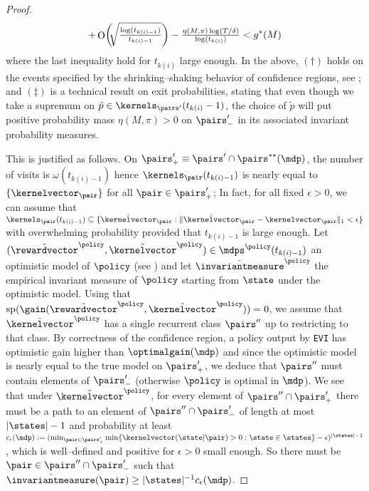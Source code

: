 \documentclass[preprint,cleveref,12pt]{colt2025}
\DeclarePairedDelimiter{\braces}{\{}{\}}	%
\DeclarePairedDelimiter{\parens}{(}{)}	%
\DeclarePairedDelimiter{\abs}{\lvert}{\rvert}	%
\DeclarePairedDelimiter{\norm}{\lVert}{\rVert}	%
\newcommand{\vecspan}[1]{\mathrm{sp}\parens{#1}}
\DeclareMathOperator*{\OH}{\mathrm{O}}
\def\model{\mdp}
\def\models{\mdps}
\def\kernel{\kernelvector}
\def\reward{\rewardvector}
\def\optgain{\optimalgain} %
\def\imeasure{\invariantmeasure}
\begin{document}
\begin{proof}
\begin{align*}
            + \OH \parens*{ \!\! \sqrt{ \tfrac{\log(t_{k(i)-1})}{t_{k(i)-1}} } }
            - \tfrac{\eta(M, \pi) \log(T/\delta)}{\log (t_{k(i)})}
            < g^*(M)
        \end{align*}
        where the last inequality hold for $t_{k(i)}$ large enough.
        In the above, $(\dagger)$ holds on the events specified by the shrinking--shaking behavior of confidence regions, see ; 
        and $(\ddagger)$ is a technical result on exit probabilities, stating that even though we take a supremum on $\tilde{p} \in \kernels_{\pairs'}(t_{k(i)}-1)$, the choice of $\tilde{p}$ will put positive probability mass $\eta(M, \pi) > 0$ on $\pairs'_-$ in its associated invariant probability measures.

        This is justified as follows. 
        On $\pairs_+' \equiv \pairs' \cap \pairs^{**}(\model)$, the number of visits is $\omega(t_{k(i)-1})$ hence $\kernels_\pair(t_{k(i)-1})$ is nearly equal to $\braces{\kernel_\pair}$ for all $\pair \in \pairs_+'$; In fact, for all fixed $\epsilon > 0$, we can assume that $\kernels_\pair(t_{k(i)-1}) \subseteq \braces{\tilde{\kernel}_\pair : \norm{\tilde{\kernel}_\pair - \kernel_\pair}_1 < \epsilon}$ with overwhelming probability provided that $t_{k(i)-1}$ is large enough. 
        Let $(\tilde{\reward}^\policy, \tilde{\kernel}^\policy) \in \models^\policy(t_{k(i)-1})$ an optimistic model of $\policy$ (see ) and let $\tilde{\imeasure}^\policy$ the empirical invariant measure of $\policy$ starting from $\state$ under the optimistic model. 
        Using that $\vecspan{\gain(\tilde{\reward}^\policy, \tilde{\kernel}^\policy)} = 0$, we assume that $\tilde{\kernel}^\policy$ has a single recurrent class $\pairs''$ up to restricting to that class. 
        By correctness of the confidence region, a policy output by \texttt{EVI} has optimistic gain higher than $\optgain(\model)$ and since the optimistic model is nearly equal to the true model on $\pairs'_+$, we deduce that $\pairs''$ must contain elements of $\pairs'_-$ (otherwise $\policy$ is optimal in $\model$). 
        We see that under $\tilde{\kernel}^\policy$, for every element of $\pairs'' \cap \pairs'_+$ there must be a path to an element of $\pairs'' \cap \pairs'_-$ of length at most $\abs{\states}-1$ and probability at least $c_\epsilon(\model) := (\min_{\pair \in \pairs'_+} \min \braces{\kernel(\state|\pair) > 0 : \state \in \states} - \epsilon)^{\abs{\states}-1}$, which is well--defined and positive for $\epsilon > 0$ small enough. 
        So there must be $\pair \in \pairs'' \cap \pairs'_-$ such that $\tilde{\imeasure}(\pair) \ge \abs{\states}^{-1} c_\epsilon(\model)$. 

\end{proof}
\end{document}
